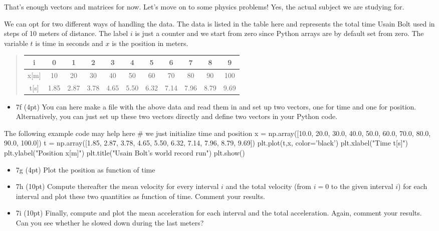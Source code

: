 \documentclass[%
oneside,                 %
final,                   %
10pt]{article}
\begin{document}
That's enough vectors and matrices for now. Let's move on to some physics problems! Yes, the actual subject we are studying for. 

We can opt for two different ways of handling the data. The data is listed in the table here and represents the total time Usain Bolt used in steps of  10 meters of distance. The label $i$ is just a counter and we start from zero since Python arrays are by default set from zero. The variable $t$ is time in seconds and $x$ is the position in meters.


\begin{quote}
\begin{tabular}{ccccccccccc}
\hline
\multicolumn{1}{c}{ i } & \multicolumn{1}{c}{ 0 } & \multicolumn{1}{c}{ 1 } & \multicolumn{1}{c}{ 2 } & \multicolumn{1}{c}{ 3 } & \multicolumn{1}{c}{ 4 } & \multicolumn{1}{c}{ 5 } & \multicolumn{1}{c}{ 6 } & \multicolumn{1}{c}{ 7 } & \multicolumn{1}{c}{ 8 } & \multicolumn{1}{c}{ 9 } \\
\hline
x[m] & 10   & 20   & 30   & 40   & 50   & 60   & 70   & 80   & 90   & 100  \\
\hline
t[s] & 1.85 & 2.87 & 3.78 & 4.65 & 5.50 & 6.32 & 7.14 & 7.96 & 8.79 & 9.69 \\
\hline
\end{tabular}
\end{quote}

\noindent
\begin{itemize}
\item 7f (4pt) You can here make a file with the above data and read them in and set up two vectors, one for time and one for position. Alternatively, you can just set up these two vectors directly and define two vectors in your Python code.
\end{itemize}

\noindent
The following example code may help here
\bpycod
# we just initialize time and position
x = np.array([10.0, 20.0, 30.0, 40.0, 50.0, 60.0, 70.0, 80.0, 90.0, 100.0])
t = np.array([1.85, 2.87, 3.78, 4.65, 5.50, 6.32, 7.14, 7.96, 8.79, 9.69])
plt.plot(t,x, color='black')
plt.xlabel("Time t[s]")
plt.ylabel("Position x[m]")
plt.title("Usain Bolt's world record run")
plt.show()
\epycod

\begin{itemize}
\item 7g (4pt) Plot the position as function of time

\item 7h (10pt) Compute thereafter the mean velocity for every interval $i$ and the total velocity (from $i=0$ to the given interval $i$) for each interval and plot these two quantities as function of time. Comment your results.

\item 7i (10pt) Finally, compute and plot the mean acceleration for each interval and the total acceleration. Again, comment your results. Can you see whether he slowed down during the last meters? 
\end{itemize}

\noindent


\end{document}
